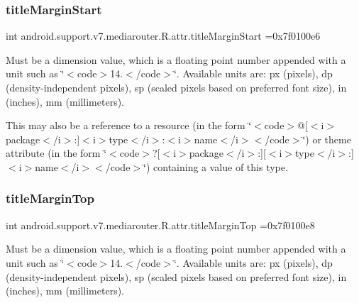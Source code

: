 \subsubsection{\texorpdfstring{title\+Margin\+Start}{titleMarginStart}}
{\footnotesize\ttfamily int android.\+support.\+v7.\+mediarouter.\+R.\+attr.\+title\+Margin\+Start =0x7f0100e6\hspace{0.3cm}{\ttfamily [static]}}

Must be a dimension value, which is a floating point number appended with a unit such as \char`\"{}$<$code$>$14.\+5sp$<$/code$>$\char`\"{}. Available units are\+: px (pixels), dp (density-\/independent pixels), sp (scaled pixels based on preferred font size), in (inches), mm (millimeters). 

This may also be a reference to a resource (in the form \char`\"{}$<$code$>$@\mbox{[}$<$i$>$package$<$/i$>$\+:\mbox{]}$<$i$>$type$<$/i$>$\+:$<$i$>$name$<$/i$>$$<$/code$>$\char`\"{}) or theme attribute (in the form \char`\"{}$<$code$>$?\mbox{[}$<$i$>$package$<$/i$>$\+:\mbox{]}\mbox{[}$<$i$>$type$<$/i$>$\+:\mbox{]}$<$i$>$name$<$/i$>$$<$/code$>$\char`\"{}) containing a value of this type. \mbox{\label{classandroid_1_1support_1_1v7_1_1mediarouter_1_1R_1_1attr_a5bb3e1cd77d6b3ef36342df2fc7f7a4b}} 
\subsubsection{\texorpdfstring{title\+Margin\+Top}{titleMarginTop}}
{\footnotesize\ttfamily int android.\+support.\+v7.\+mediarouter.\+R.\+attr.\+title\+Margin\+Top =0x7f0100e8\hspace{0.3cm}{\ttfamily [static]}}

Must be a dimension value, which is a floating point number appended with a unit such as \char`\"{}$<$code$>$14.\+5sp$<$/code$>$\char`\"{}. Available units are\+: px (pixels), dp (density-\/independent pixels), sp (scaled pixels based on preferred font size), in (inches), mm (millimeters). 

